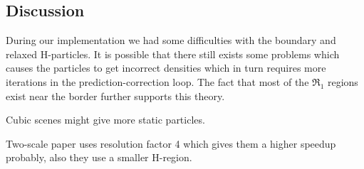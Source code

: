 \documentclass[../../main.tex]{subfiles}
\begin{document}
\subsection{Discussion}

During our implementation we had some difficulties with the boundary and relaxed H-particles. It is possible that there still exists some problems which causes the particles to get incorrect densities which in turn requires more iterations in the prediction-correction loop. The fact that most of the $\Re_1$ regions exist near the border further supports this theory. 

Cubic scenes might give more static particles. 

Two-scale paper uses resolution factor 4 which gives them a higher speedup probably, also they use a smaller H-region. 
\end{document}
